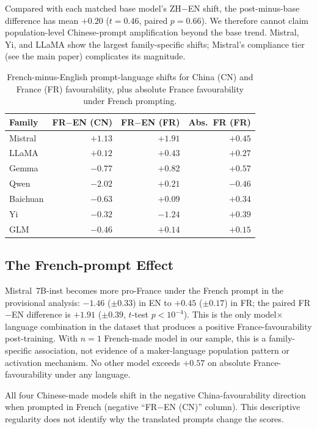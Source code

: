 \documentclass[letterpaper]{article}
\begin{document}
Compared with each matched base model's ZH$-$EN shift, the post-minus-base difference has mean $+0.20$ ($t = 0.46$, paired $p = 0.66$). We therefore cannot claim population-level Chinese-prompt amplification beyond the base trend. Mistral, Yi, and LLaMA show the largest family-specific shifts; Mistral's compliance tier (see the main paper) complicates its magnitude.

\begin{table}[b]
\centering
\small
\setlength{\tabcolsep}{1mm}
\begin{tabular}{@{}l r r r@{}}
\toprule
Family & FR$-$EN (CN) & FR$-$EN (FR) & Abs.\ FR (FR) \\
\midrule
Mistral  & $+1.13$ & $\mathbf{+1.91}$ & $\mathbf{+0.45}$ \\
LLaMA    & $+0.12$ & $+0.43$          & $+0.27$ \\
Gemma    & $-0.77$ & $+0.82$          & $+0.57$ \\
Qwen     & $-2.02$ & $+0.21$          & $-0.46$ \\
Baichuan & $-0.63$ & $+0.09$          & $+0.34$ \\
Yi       & $-0.32$ & $-1.24$          & $+0.39$ \\
GLM      & $-0.46$ & $+0.14$          & $+0.15$ \\
\bottomrule
\end{tabular}
\caption{French-minus-English prompt-language shifts for China (CN) and France (FR) favourability, plus absolute France favourability under French prompting.}
\label{tab:french}
\end{table}

\subsection{The French-prompt Effect}

Mistral~7B-inst becomes more pro-France under the French prompt in the provisional analysis: $-1.46$ ($\pm 0.33$) in EN to $+0.45$ ($\pm 0.17$) in FR; the paired FR$-$EN difference is $+1.91$ ($\pm 0.39$, $t$-test $p < 10^{-4}$). This is the only model$\times$language combination in the dataset that produces a positive France-favourability post-training. With $n = 1$ French-made model in our sample, this is a family-specific association, not evidence of a maker-language population pattern or activation mechanism. No other model exceeds $+0.57$ on absolute France-favourability under any language.

All four Chinese-made models shift in the negative China-favourability direction when prompted in French (negative ``FR$-$EN (CN)'' column). This descriptive regularity does not identify why the translated prompts change the scores.
\end{document}

